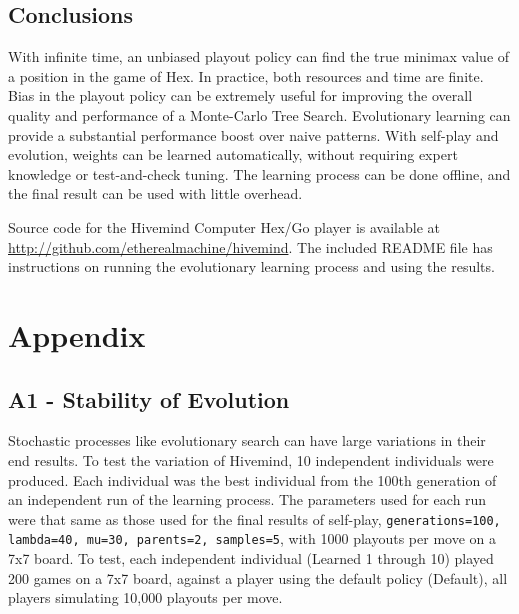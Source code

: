 \documentclass[11pt]{report}
\begin{document}
\subsection{Conclusions}
With infinite time, an unbiased playout policy can find the true minimax value of a position in the game of Hex. In practice, both resources and time are finite. Bias in the playout policy can be extremely useful for improving the overall quality and performance of a Monte-Carlo Tree Search. Evolutionary learning can provide a substantial performance boost over naive patterns. With self-play and evolution, weights can be learned automatically, without requiring expert knowledge or test-and-check tuning. The learning process can be done offline, and the final result can be used with little overhead.

Source code for the Hivemind Computer Hex/Go player is available at \url{http://github.com/etherealmachine/hivemind}. The included README file has instructions on running the evolutionary learning process and using the results.

\section{Appendix}\label{appendix}
\subsection{A1 - Stability of Evolution}
Stochastic processes like evolutionary search can have large variations in their end results. To test the variation of Hivemind, 10 independent individuals were produced. Each individual was the best individual from the 100th generation of an independent run of the learning process. The parameters used for each run were that same as those used for the final results of self-play,  \texttt{generations=100, lambda=40, mu=30, parents=2, samples=5}, with 1000 playouts per move on a 7x7 board. To test, each independent individual (Learned 1 through 10) played 200 games on a 7x7 board, against a player using the default policy (Default), all players simulating 10,000 playouts per move.
\end{document}
